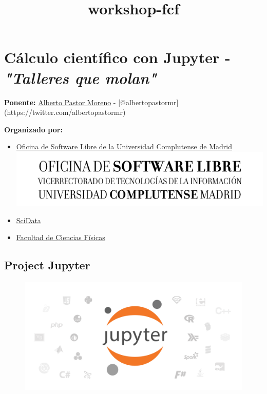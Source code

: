 \documentclass[11pt]{article}
\title{workshop-fcf}
\makeatletter
\def\maxwidth{\ifdim\Gin@nat@width>\linewidth\linewidth
    \else\Gin@nat@width\fi}
\let\Oldincludegraphics\includegraphics
\renewcommand{\includegraphics}[1]{\Oldincludegraphics[width=.8\maxwidth]{#1}}
\makeatother
\begin{document}
    
    
    \maketitle
    
    

    
    \section{\texorpdfstring{Cálculo científico con Jupyter -
\emph{"Talleres que
molan"}}{Cálculo científico con Jupyter - "Talleres que molan"}}\label{cuxe1lculo-cientuxedfico-con-jupyter---talleres-que-molan}

    

    \textbf{Ponente:} \href{https://albertopastormr.me/}{Alberto Pastor
Moreno} - {[}@albertopastormr{]}(https://twitter.com/albertopastormr)

\textbf{Organizado por:}

\begin{itemize}
\item
  \href{https://www.ucm.es/oficina-de-software-libre/}{Oficina de
  Software Libre de la Universidad Complutense de Madrid}
  \includegraphics{otea.png}
\item
  \href{https://scidataucm.org/}{SciData} 
\item
  \href{https://fisicas.ucm.es/}{Facultad de Ciencias Físicas} 
\end{itemize}

    \subsection{Project Jupyter}\label{project-jupyter}

    \begin{figure}
\centering
\includegraphics{jupyter-logo2.png}
\caption{}
\end{figure}
\end{document}

